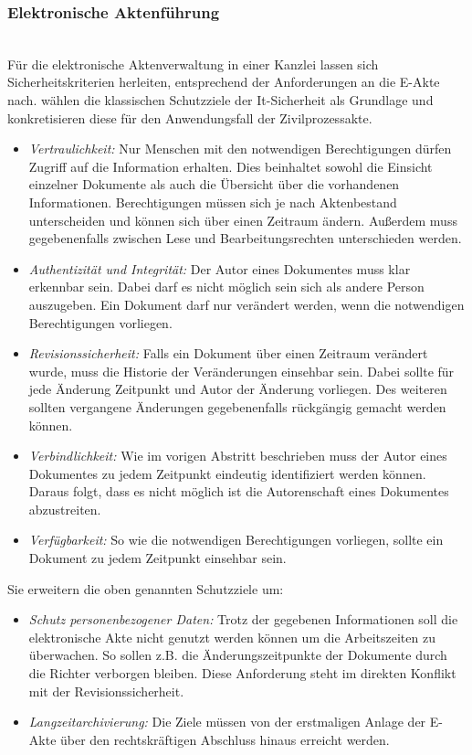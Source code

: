 \subsubsection{Elektronische Aktenführung}\hspace*{\fill} \\
Für die elektronische Aktenverwaltung in einer Kanzlei lassen sich Sicherheitskriterien herleiten, entsprechend der Anforderungen an die E-Akte nach.
\textcite{eakten-anforderungen} wählen die klassischen Schutzziele der It-Sicherheit als Grundlage und konkretisieren diese für den Anwendungsfall der Zivilprozessakte.
\begin{itemize}
\item \textit{Vertraulichkeit:}
Nur Menschen mit den notwendigen Berechtigungen dürfen Zugriff auf die Information erhalten. Dies beinhaltet sowohl die Einsicht einzelner Dokumente als auch die Übersicht über die vorhandenen Informationen. Berechtigungen müssen sich je nach Aktenbestand unterscheiden und können sich über einen Zeitraum ändern. Außerdem muss gegebenenfalls zwischen Lese und Bearbeitungsrechten unterschieden werden.
\item \textit{Authentizität und Integrität:}
Der Autor eines Dokumentes muss klar erkennbar sein. Dabei darf es nicht möglich sein sich als andere Person auszugeben. Ein Dokument darf nur verändert werden, wenn die notwendigen Berechtigungen vorliegen. 
\item \textit{Revisionssicherheit:}
Falls ein Dokument über einen Zeitraum verändert wurde, muss die Historie der Veränderungen einsehbar sein. Dabei sollte für jede Änderung Zeitpunkt und Autor der Änderung vorliegen. Des weiteren sollten vergangene Änderungen gegebenenfalls rückgängig gemacht werden können.
\item \textit{Verbindlichkeit:}
Wie im vorigen Abstritt beschrieben muss der Autor eines Dokumentes zu jedem Zeitpunkt eindeutig identifiziert werden können. Daraus folgt, dass es nicht möglich ist die Autorenschaft eines Dokumentes abzustreiten.
\item \textit{Verfügbarkeit:}
So wie die notwendigen Berechtigungen vorliegen, sollte ein Dokument zu jedem Zeitpunkt einsehbar sein.
\end{itemize}
Sie erweitern die oben genannten Schutzziele um:
\begin{itemize}
\item \textit{Schutz personenbezogener Daten:}
Trotz der gegebenen Informationen soll die elektronische Akte nicht genutzt werden können um die Arbeitszeiten zu überwachen. So sollen z.B. die Änderungszeitpunkte der Dokumente durch die Richter verborgen bleiben. Diese Anforderung steht im direkten Konflikt mit der Revisionssicherheit.
\item \textit{Langzeitarchivierung:}
Die Ziele müssen von der erstmaligen Anlage der E-Akte über den rechtskräftigen Abschluss hinaus erreicht werden.
\end{itemize}
